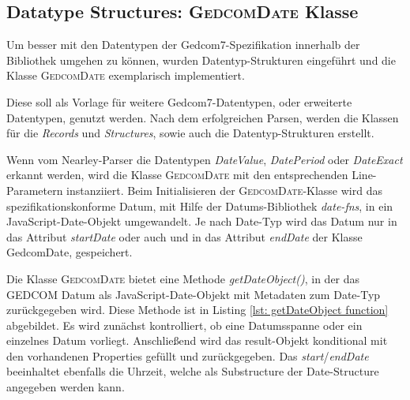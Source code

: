 \subsection{Datatype Structures: \textsc{GedcomDate} Klasse}
Um besser mit den Datentypen der Gedcom7-Spezifikation innerhalb der Bibliothek umgehen zu können, 
wurden Datentyp-Strukturen eingeführt und die Klasse \textsc{GedcomDate} exemplarisch implementiert.

Diese soll als Vorlage für weitere Gedcom7-Datentypen, oder erweiterte Datentypen, genutzt werden.
Nach dem erfolgreichen Parsen, werden die Klassen für die \textit{Records} und \textit{Structures}, 
sowie auch die Datentyp-Strukturen erstellt.

Wenn vom Nearley-Parser die Datentypen \textit{DateValue}, \textit{DatePeriod} oder \textit{DateExact}
erkannt werden, wird die Klasse \textsc{GedcomDate} mit den entsprechenden Line-Parametern instanziiert.
Beim Initialisieren der \textsc{GedcomDate}-Klasse wird das spezifikationskonforme Datum, mit Hilfe der 
Datums-Bibliothek \textit{date-fns}, in ein JavaScript-Date-Objekt umgewandelt.
Je nach Date-Typ wird das Datum nur in das Attribut \textit{startDate} oder auch und in das Attribut
\textit{endDate} der Klasse GedcomDate, gespeichert.


Die Klasse \textsc{GedcomDate} bietet eine Methode \textit{getDateObject()}, in der das GEDCOM Datum 
als JavaScript-Date-Objekt mit Metadaten zum Date-Typ zurückgegeben wird.
Diese Methode ist in Listing \ref{lst: getDateObject function} abgebildet. Es wird zunächst kontrolliert,
ob eine Datumsspanne oder ein einzelnes Datum vorliegt. Anschließend wird das result-Objekt konditional
mit den vorhandenen Properties gefüllt und zurückgegeben. Das \textit{start}/\textit{endDate} beeinhaltet ebenfalls die Uhrzeit, 
welche als Substructure der Date-Structure angegeben werden kann.

